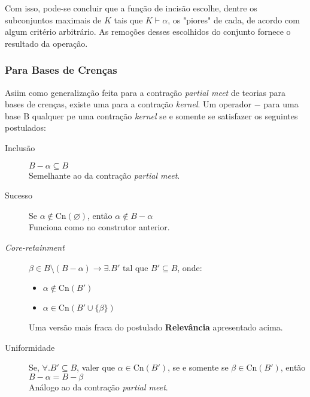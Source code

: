 Com isso, pode-se concluir que a função de incisão escolhe, dentre os subconjuntos maximais de $ K $ tais que $ K \vdash \alpha $, os "piores" de cada, de acordo com algum critério arbitrário. As remoções desses escolhidos do conjunto fornece o resultado da operação.

\subsubsection{Para Bases de Crenças}

Asiim como generalização feita para a contração \textit{partial meet} de teorias para bases de crenças, existe uma para a contração \textit{kernel}. Um operador $ - $ para uma base B qualquer pe uma contração \textit{kernel} se e somente se satisfazer os seguintes postulados:

\begin{description}
	\item[Inclusão] $ B - \alpha \subseteq B$ \\ Semelhante ao da contração \textit{partial meet}.
	\item[Sucesso] Se $ \alpha \notin \text{Cn}(\varnothing) $, então $ \alpha \notin B - \alpha $ \\ Funciona como no construtor anterior.
	\item[\textit{Core-retainment}] $ \beta \in B \setminus (B - \alpha) \to \exists. B' \text{ tal que } B' \subseteq B $, onde:
	\begin{itemize}
		\item $ \alpha \notin \text{Cn}(B') $
		\item $ \alpha \in \text{Cn}(B' \cup \{\beta\}) $ 
	\end{itemize}
	Uma versão mais fraca do postulado \textbf{Relevância} apresentado acima.
	\item[Uniformidade] Se, $ \forall.B' \subseteq B $, valer que $ \alpha \in \text{Cn}(B') $, se e somente se $ \beta \in \text{Cn}(B') $, então $ B - \alpha = B - \beta $ \\
	Análogo ao da contração \textit{partial meet}. 
\end{description}